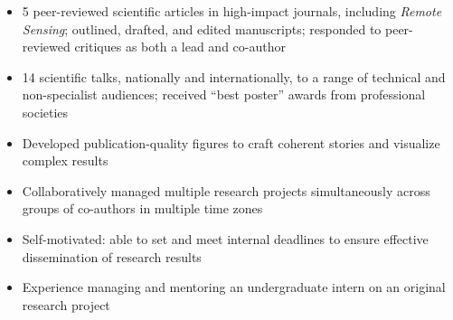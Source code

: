 \documentclass[10pt,a4paper,ragged2e,withhyper]{altacv}
\begin{document}
\begin{paracol}{2}
  \begin{itemize}
    \item 5 peer-reviewed scientific articles in high-impact journals, including \textit{Remote Sensing}; outlined, drafted,
    and edited manuscripts; responded to peer-reviewed critiques as both a lead and co-author
    \item 14 scientific talks, nationally and internationally, to a range of technical and non-specialist audiences; received ``best poster'' awards from professional societies
    \item Developed publication-quality figures to craft coherent stories and visualize complex results
  \end{itemize}

  \vspace{-0.5em}
  \divider

  \begin{itemize}
    \item Collaboratively managed multiple research projects simultaneously across groups of co-authors in multiple time zones
    \item Self-motivated: able to set and meet internal deadlines to ensure effective dissemination of research results
    \item Experience managing and mentoring an undergraduate intern on an original research project
  \end{itemize}








\end{paracol}
\end{document}
